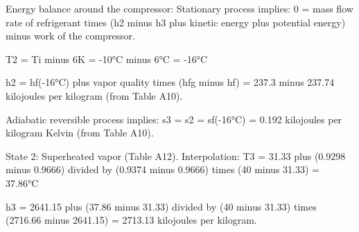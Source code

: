 Energy balance around the compressor:  
Stationary process implies:  
0 = mass flow rate of refrigerant times (h2 minus h3 plus kinetic energy plus potential energy) minus work of the compressor.  

T2 = Ti minus 6K  
= -10°C minus 6°C = -16°C  

h2 = hf(-16°C) plus vapor quality times (hfg minus hf)  
= 237.3 minus 237.74 kilojoules per kilogram (from Table A10).  

Adiabatic reversible process implies:  
s3 = s2 = sf(-16°C) = 0.192 kilojoules per kilogram Kelvin (from Table A10).  

State 2: Superheated vapor (Table A12).  
Interpolation:  
T3 = 31.33 plus (0.9298 minus 0.9666) divided by (0.9374 minus 0.9666) times (40 minus 31.33)  
= 37.86°C  

h3 = 2641.15 plus (37.86 minus 31.33) divided by (40 minus 31.33) times (2716.66 minus 2641.15)  
= 2713.13 kilojoules per kilogram.